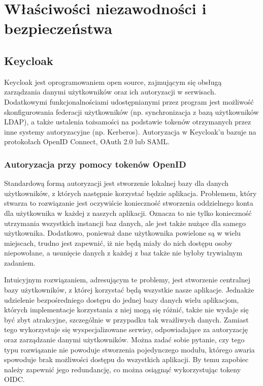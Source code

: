 \documentclass[11pt,a4paper,twoside]{article}
\begin{document}
\section{Właściwości niezawodności i bezpieczeństwa}
\subsection{Keycloak}
Keycloak jest oprogramowaniem open source, zajmującym się obsługą zarządzania danymi użytkowników oraz ich autoryzacji w serwisach. Dodatkowymi funkcjonalnościami udostępnianymi przez program jest możliwość skonfigurowania federacji użytkowników (np. synchronizacja z bazą użytkowników LDAP), a także ustalenia tożsamości na podstawie tokenów otrzymanych przez inne systemy autoryzacyjne (np. Kerberos). Autoryzacja w Keycloak'u bazuje na protokołach OpenID Connect, OAuth 2.0 lub SAML. 

\subsubsection{Autoryzacja przy pomocy tokenów OpenID}

Standardową formą autoryzacji jest stworzenie lokalnej bazy dla danych użytkowników, z których następnie korzystać będzie aplikacja. Problemem, który stwarza to rozwiązanie jest oczywiście konieczność stworzenia oddzielnego konta dla użytkownika w każdej z naszych aplikacji. Oznacza to nie tylko konieczność utrzymania wszystkich instancji baz danych, ale jest także nużące dla samego użytkownika. Dodatkowo, ponieważ dane użytkownika powielone są w wielu miejscach, trudno jest zapewnić, iż nie będą miały do nich dostępu osoby niepowołane, a usunięcie danych z każdej z baz także nie byłoby trywialnym zadaniem.

Intuicyjnym rozwiązaniem, adresującym te problemy, jest stworzenie centralnej bazy użytkowników, z której korzystać będą wszystkie nasze aplikacje. Jednakże udzielenie bezpośredniego dostępu do jednej bazy danych wielu aplikacjom, których implementacje korzystania z niej mogą się różnić, także nie wydaje się być zbyt atrakcyjne, szczególnie w przypadku tak wrażliwych danych. Zamiast tego wykorzystuje się wyspecjalizowane serwisy, odpowiadające za autoryzację oraz zarządzanie danymi użytkowników. Można zadać sobie pytanie, czy tego typu rozwiązanie nie powoduje stworzenia pojedynczego modułu, którego awaria spowoduje brak możliwości dostępu do wszystkich aplikacji. By temu zapobiec należy zapewnić jego redundancję, co można osiągnąć wykorzystując tokeny OIDC.
\end{document}
